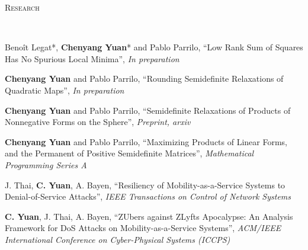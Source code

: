 \documentclass[9pt]{article}
\newenvironment{changemargin}[2]{%
  \begin{list}{}{%
      \setlength{\topsep}{0pt}%
      \setlength{\leftmargin}{#1}%
      \setlength{\rightmargin}{#2}%
      \setlength{\listparindent}{\parindent}%
      \setlength{\itemindent}{\parindent}%
      \setlength{\parsep}{\parskip}%
    }%
  \item[]}{\end{list}
}
\newcommand{\lineover}{
  \begin{changemargin}{-0.05in}{-0.05in}
    \vspace*{-8pt}
    \hrulefill \\
    \vspace*{-2pt}
  \end{changemargin}
}
\newcommand{\header}[1]{
  \begin{changemargin}{-0.5in}{-0.5in}
    \scshape{#1}\\
    \lineover
  \end{changemargin}
}
\newenvironment{body} {
  \vspace*{-16pt}
  \begin{changemargin}{-0.25in}{-0.5in}
  }
  {\end{changemargin}
}
\begin{document}
\header{Research}
\begin{body}
  \vspace{14pt}

  Beno\^it Legat*, \textbf{Chenyang Yuan}* and Pablo Parrilo, ``Low Rank Sum of
  Squares Has No Spurious Local Minima'', \emph{In preparation}\\
  \smallskip

  \textbf{Chenyang Yuan} and Pablo Parrilo,
  ``Rounding Semidefinite Relaxations of Quadratic Maps'', \emph{In preparation}\\
  \smallskip

  \textbf{Chenyang Yuan} and Pablo Parrilo, ``Semidefinite Relaxations of
  Products of
  Nonnegative Forms on the Sphere'', \emph{Preprint, arxiv}\\
  \smallskip

  \textbf{Chenyang Yuan} and Pablo Parrilo, ``Maximizing Products of Linear
  Forms, and
  the Permanent of Positive Semidefinite Matrices'', \emph{Mathematical Programming Series A}\\
  \smallskip

  J. Thai, \textbf{C. Yuan}, A. Bayen, ``Resiliency of Mobility-as-a-Service
  Systems to
  Denial-of-Service Attacks'', \emph{IEEE Transactions on Control of Network Systems}\\
  \smallskip

  \textbf{C. Yuan}, J. Thai, A. Bayen, ``ZUbers against ZLyfts Apocalypse: An
  Analysis Framework for DoS Attacks on Mobility-as-a-Service Systems'',
  \emph{ACM/IEEE International Conference on Cyber-Physical Systems
    (ICCPS)}
\end{body}
\smallskip

%
\end{document}

